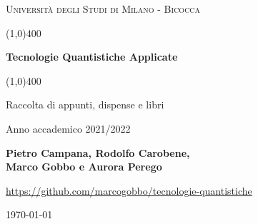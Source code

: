 \documentclass[a4paper, 12pt]{book}
\numberwithin{equation}{section}
\numberwithin{figure}{chapter}
\begin{document}
    \begin{titlepage}
        \begin{center}
            \vspace*{3cm}
            {\scshape\LARGE Università degli Studi di Milano - Bicocca \par}
            \vspace{1.0cm}
            \line(1,0){400} \\
            {\huge\bfseries Tecnologie Quantistiche Applicate \par}
            \line(1,0){400} \\
 	        \vspace{1.0cm}
            {\Large Raccolta di appunti, dispense e libri \par}
            \vspace{1.0cm}
            {Anno accademico 2021/2022 \par}
            \vspace{0.5cm}
            {\bfseries Pietro Campana, Rodolfo Carobene,\\ Marco Gobbo e  Aurora Perego  \par}
            \vspace{0.5cm}
            {\url{https://github.com/marcogobbo/tecnologie-quantistiche} \par}
            \vspace*{\fill}
            {\large \today \par}
        \end{center}
    \end{titlepage}
    \tableofcontents
    
    
    
    
    
    
    
    
    
    
    
    
    
    
    
    
    
    
    
    
    
\end{document}
